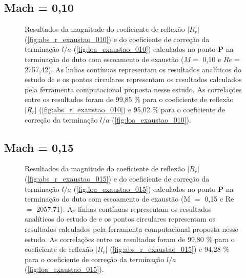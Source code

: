 \subsection{Mach = 0,10}
\begin{figure}[ht!]
\begin{subfigure}{\scaleA \textwidth}
  
\end{subfigure}%
\begin{subfigure}{\scaleA \textwidth}
  
\end{subfigure}
\caption[Resultados de $|R_{r}|$ e $l/a$ com escoamento de exaustão ($M =$ 0,10 e $Re =$ 2757,42)]{Resultados da magnitude do coeficiente de reflexão $|R_{r}|$ (\ref{fig:abs_r_exaustao_010}) e do coeficiente de correção da terminação $l/a$ (\ref{fig:loa_exaustao_010}) calculados no ponto $\textbf{P}$ na terminação do duto com escoamento de exaustão ($M =$ 0,10 e $Re =$ 2757,42). As linhas contínuas representam os resultados analíticos do estudo de  e os pontos circulares representam os resultados calculados pela ferramenta computacional proposta nesse estudo. As correlações entre os resultados foram de 99,85 \% para o coeficiente de reflexão $|R_{r}|$ (\ref{fig:abs_r_exaustao_010}) e 95,02 \% para o coeficiente de correção da terminação $l/a$ (\ref{fig:loa_exaustao_010}).}
\label{fig:resultados_exaustao_010}
\end{figure}


\newpage
\subsection{Mach = 0,15}

\begin{figure}[ht!]
\begin{subfigure}{\scaleA \textwidth}
  
\end{subfigure}%
\begin{subfigure}{\scaleA \textwidth}
  
\end{subfigure}
\caption[Resultados de $|R_{r}|$ e $l/a$ com escoamento de exaustão (M $=$ 0,15 e Re $=$ 2057,71)]{Resultados da magnitude do coeficiente de reflexão $|R_{r}|$ (\ref{fig:abs_r_exaustao_015}) e do coeficiente de correção da terminação $l/a$ (\ref{fig:loa_exaustao_015}) calculados no ponto $\textbf{P}$ na terminação do duto com escoamento de exaustão (M $=$ 0,15 e Re $=$ 2057,71). As linhas contínuas representam os resultados analíticos do estudo de  e os pontos circulares representam os resultados calculados pela ferramenta computacional proposta nesse estudo. As correlações entre os resultados foram de 99,80 \% para o coeficiente de reflexão $|R_{r}|$ (\ref{fig:abs_r_exaustao_015}) e 94,28 \% para o coeficiente de correção da terminação $l/a$ (\ref{fig:loa_exaustao_015}).}
\label{fig:resultados_exaustao_015}
\end{figure}


